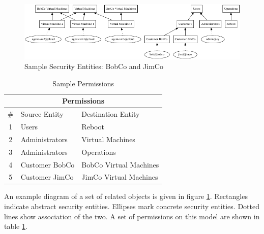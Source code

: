 \begin{figure}[t]
        \begin{center}\includegraphics[width=\myfigwidth,height=\myfigheight,keepaspectratio]{figs/dot/bobco1}\end{center}
        \caption[Example Security Entities]{Sample Security Entities: BobCo and JimCo}\label{fig:bobco1-sec}
\end{figure}
\begin{table}[b]
        \begin{center}
                \begin{tabular}{| c | l | l |}
                        \hline
                                \multicolumn{3}{|c|}{Permissions} \\
                        \hline
                                \# & Source Entity & Destination Entity \\
                        \hline \hline
                                1 & Users & Reboot \\
                        \hline
                                2 & Administrators & Virtual Machines \\
                        \hline
                                3 & Administrators & Operations \\
                        \hline
                                4 & Customer BobCo & BobCo Virtual Machines \\
                        \hline
                                5 & Customer JimCo & JimCo Virtual Machines \\
                        \hline
                \end{tabular}
        \end{center}
        \caption{Sample Permissions}
        \label{tbl:bobco1-perm}
\end{table}

An example diagram of a set of related objects is given in figure \ref{fig:bobco1-sec}.  Rectangles indicate abstract security entities. Ellipses mark concrete security entities. Dotted lines show association of the two.  A set of permissions on this model are shown in table \ref{tbl:bobco1-perm}.

